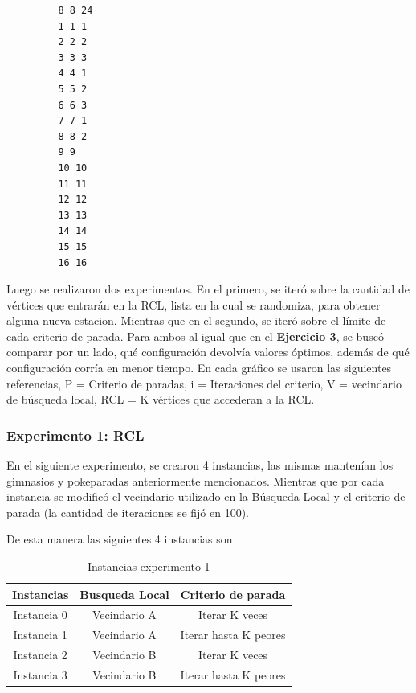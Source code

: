 \begin{codesnippet}
  \begin{verbatim}
         8 8 24
         1 1 1
         2 2 2
         3 3 3
         4 4 1
         5 5 2
         6 6 3
         7 7 1
         8 8 2
         9 9
         10 10
         11 11
         12 12
         13 13
         14 14
         15 15
         16 16
  \end{verbatim}
\end{codesnippet}

Luego se realizaron dos experimentos. En el primero, se iteró sobre la cantidad de vértices que entrarán en la RCL, lista en la cual se randomiza, para obtener alguna nueva estacion. Mientras que en el segundo, se iteró sobre el límite de cada criterio de parada. Para ambos al igual que en el \textbf{Ejercicio 3}, se buscó comparar por un lado, qué configuración devolvía valores óptimos, además de qué configuración corría en menor tiempo. En cada gráfico se usaron las siguientes referencias, P = Criterio de paradas, i = Iteraciones del criterio, V = vecindario de búsqueda local, RCL = K vértices que accederan a la RCL.

\subsubsection{Experimento 1: RCL}

En el siguiente experimento, se crearon 4 instancias, las mismas mantenían los gimnasios y pokeparadas anteriormente mencionados. Mientras que por cada instancia se modificó el vecindario utilizado en la Búsqueda Local y el criterio de parada (la cantidad de iteraciones se fijó en 100).

De esta manera las siguientes 4 instancias son 

\begin{table}[H]
\centering
\begin{tabular}{ |c|c|c| } 
 \hline
 Instancias&Busqueda Local&Criterio de parada\\ 
 \hline
 Instancia 0 & Vecindario A & Iterar K veces\\
 \hline
 Instancia 1 & Vecindario A & Iterar hasta K peores\\
 \hline
 Instancia 2 & Vecindario B & Iterar K veces \\
 \hline
 Instancia 3 & Vecindario B & Iterar hasta K peores\\
 \hline
\end{tabular}
\caption{Instancias experimento 1}
\end{table}


